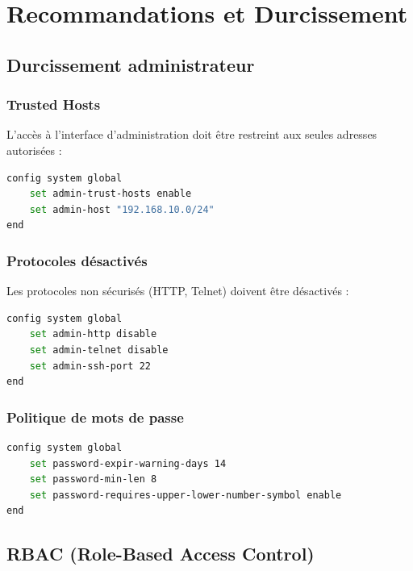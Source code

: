\chapter{Recommandations et Durcissement}
\label{chap:recommandations}

\section{Durcissement administrateur}

\subsection{Trusted Hosts}

L'accès à l'interface d'administration doit être restreint aux seules adresses autorisées :

\begin{lstlisting}[language=bash, caption={Configuration Trusted Hosts}]
config system global
    set admin-trust-hosts enable
    set admin-host "192.168.10.0/24"
end
\end{lstlisting}

\subsection{Protocoles désactivés}

Les protocoles non sécurisés (HTTP, Telnet) doivent être désactivés :

\begin{lstlisting}[language=bash, caption={Désactivation des protocoles non sécurisés}]
config system global
    set admin-http disable
    set admin-telnet disable
    set admin-ssh-port 22
end
\end{lstlisting}

\subsection{Politique de mots de passe}

\begin{lstlisting}[language=bash, caption={Politique de mots de passe}]
config system global
    set password-expir-warning-days 14
    set password-min-len 8
    set password-requires-upper-lower-number-symbol enable
end
\end{lstlisting}

\section{RBAC (Role-Based Access Control)}

